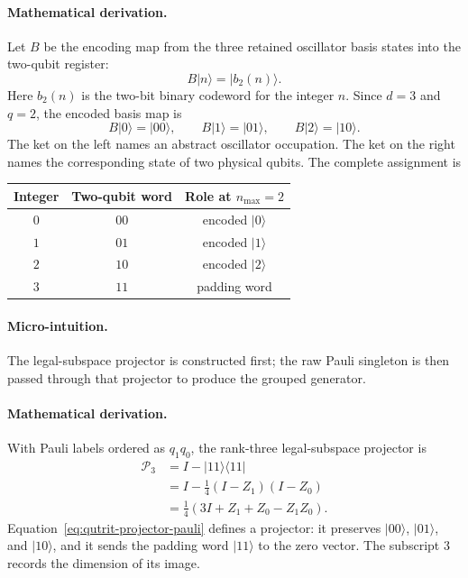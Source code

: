 \documentclass[10pt,twocolumn]{article}
\newcommand{\ket}[1]{\lvert #1\rangle}
\newcommand{\bra}[1]{\langle #1\rvert}
\newcommand{\micro}{\paragraph{Micro-intuition.}}
\newcommand{\mathderiv}{\paragraph{Mathematical derivation.}}
\begin{document}
\mathderiv Let \(B\) be the encoding map from the three retained oscillator
basis states into the two-qubit register:
\begin{equation*}
B\ket{n}=\ket{b_2(n)}.
\end{equation*}
Here \(b_2(n)\) is the two-bit binary codeword for the integer \(n\). Since
\(d=3\) and \(q=2\), the encoded basis map is
\begin{equation}
B\ket{0}=\ket{00},\qquad
B\ket{1}=\ket{01},\qquad
B\ket{2}=\ket{10}.
\label{eq:qutrit-codes}
\end{equation}
The ket on the left names an abstract oscillator occupation. The ket on the
right names the corresponding state of two physical qubits. The complete
assignment is
\begin{center}
\renewcommand{\arraystretch}{1.08}
\begin{tabular}{@{}ccc@{}}
\toprule
Integer & Two-qubit word & Role at \(n_{\max}=2\) \\
\midrule
\(0\) & \(00\) & encoded \(\ket0\) \\
\(1\) & \(01\) & encoded \(\ket1\) \\
\(2\) & \(10\) & encoded \(\ket2\) \\
\(3\) & \(11\) & padding word \\
\bottomrule
\end{tabular}
\end{center}

\micro The legal-subspace projector is constructed first; the raw Pauli
singleton is then passed through that projector to produce the grouped
generator.

\mathderiv With Pauli labels ordered as \(q_1q_0\), the rank-three
legal-subspace projector is
\begin{align}
\mathcal P_3
&=I-\ket{11}\bra{11}\nonumber\\
&=I-\frac14(I-Z_1)(I-Z_0)\nonumber\\
&=\frac14(3I+Z_1+Z_0-Z_1Z_0).
\label{eq:qutrit-projector-pauli}
\end{align}
Equation~\eqref{eq:qutrit-projector-pauli} defines a projector: it preserves
\(\ket{00}\), \(\ket{01}\), and \(\ket{10}\), and it sends the padding word
\(\ket{11}\) to the zero vector. The subscript \(3\) records the dimension of
its image.
\end{document}
